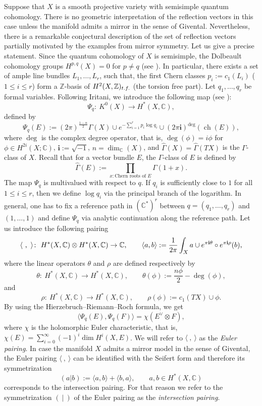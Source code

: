 \documentclass[10pt,a4paper]{article}
\numberwithin{equation}{section}
\newcommand{\CC}{\mathbb{C}}
\newcommand{\ZZ}{\mathbb{Z}}
\newcommand{\ii}{\mathbf{i}}
\begin{document}
Suppose that $X$ is a
smooth projective variety with semisimple quantum cohomology. There
is no geometric interpretation of the reflection vectors in
this case unless the manifold admits a mirror in the sense of
Givental. Nevertheless, there is a remarkable conjectural description
of the set of reflection vectors partially motivated by the examples
from mirror symmetry. Let us give a precise statement. Since the
quantum cohomology of $X$ is semisimple, the Dolbeault cohomology
groups $H^{p,q}(X)=0$ for $p\neq q$ (see \cite{HerMaTe}). In particular, there exists a set
of ample line bundles $L_1,\dots, L_r$, such that, the first Chern
classes $p_i:=c_1(L_i)$ ($1\leq i\leq r$) form a $\ZZ$-basis of
$H^2(X,\ZZ)_{\rm t.f.}$ (the torsion free part). Let $q_1,\dots, q_r$ be formal
variables. Following Iritani, we introduce the following map (see
\cite{Iritani:gamma_structure}):
\begin{equation}\label{psi}
\Psi_q\colon\ K^0(X) \to H^*(X,\CC),
\end{equation}
defined by
\[
\Psi_q(E) := (2\pi)^{\tfrac{1-n}{2}} \widehat{\Gamma}(X)\cup
e^{-\sum_{i=1}^r p_i\log q_i} \cup (2\pi\ii)^{\operatorname{deg}}
(\operatorname{ch}(E)),
\]
where $\operatorname{deg}$ is the complex degree operator, that is,
$\operatorname{deg}(\phi) = i \phi$ for $\phi\in H^{2i}(X;\CC)$,
$\ii:=\sqrt{-1}$, $n=\operatorname{dim}_\CC(X)$, and
$\widehat{\Gamma}(X) = \widehat{\Gamma}(TX)$ is the $\Gamma$-class of
$X$. Recall that for a vector bundle $E$, the $\Gamma$-class of $E$ is defined by
\[
\widehat{\Gamma}(E) := \prod_{x\colon \text{Chern roots of } E } \Gamma(1+x).
\]
The map $\Psi_q$ is multivalued with respect to $q$. If $q_i$ is
sufficiently close to $1$ for all $1\leq i\leq r$, then we define
$\log q_i$ via the principal branch of the logarithm. In general, one
has to fix a reference path in $(\CC^*)^r$ between $q=(q_1,\dots, q_r)$ and
$(1,\dots,1)$ and define $\Psi_q$ via analytic continuation along the
reference path.
Let us introduce the following pairing
\[%
\langle\ ,\ \rangle\colon\ H^*(X,\CC)\otimes H^*(X,\CC)\to \CC,\qquad
\langle a, b \rangle := \frac{1}{2\pi} \int_X a\cup {\rm e}^{\pi \ii
 \theta}\circ {\rm e}^{\pi\ii\rho} (b),
\]
where the linear operators $\theta$ and $\rho$ are defined
respectively by
\[
\theta\colon\ H^*(X,\CC)\to H^*(X,\CC),\qquad
\theta(\phi):=\frac{n \phi }{2}-\operatorname{deg}(\phi),
\]
and
\[
\rho\colon\ H^*(X,\CC)\to H^*(X,\CC),\qquad \rho(\phi) := c_1(TX)\cup \phi.
\]
By using the Hierzebruch--Riemann--Roch formula, we get
\[
\langle \Psi_q(E),\Psi_q(F) \rangle = \chi(E^\vee \otimes F),
\]
where $\chi$ is the holomorphic Euler characteristic, that is,
$\chi(E)=\sum_{i=0}^\infty (-1)^i \operatorname{dim} H^i(X,E)$. We
will refer to $\langle\ ,\ \rangle$ as the {\em Euler pairing}. In
case the manifold $X$ admits a mirror model in the sense of Givental,
the Euler pairing $\langle\ ,\ \rangle$ can be identified with the
Seifert form and therefore its symmetrization
\[
(a|b):= \langle a, b\rangle + \langle b,a\rangle,\qquad a,b\in H^*(X,\CC)
\]
corresponds to the intersection pairing. For that reason we refer to
the symmetrization $(\ |\ )$ of the Euler pairing as the {\em
 intersection pairing}.
\end{document}
